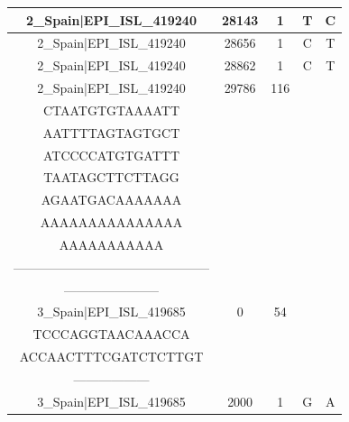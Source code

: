 \documentclass[a4paper,10pt]{article}
\begin{document}
\begin{longtable}{@{}ccccc@{}}
2\_Spain|EPI\_ISL\_419240 & 28143 & 1 & T & C \\* \midrule
2\_Spain|EPI\_ISL\_419240 & 28656 & 1 & C & T \\* \midrule
2\_Spain|EPI\_ISL\_419240 & 28862 & 1 & C & T \\* \midrule
2\_Spain|EPI\_ISL\_419240 & 29786 & 116 & \begin{tabular}[c]{@{}c@{}}CTATATGGAAGAGCC\\ CTAATGTGTAAAATT\\ AATTTTAGTAGTGCT\\ ATCCCCATGTGATTT\\ TAATAGCTTCTTAGG\\ AGAATGACAAAAAAA\\ AAAAAAAAAAAAAAA\\ AAAAAAAAAAA\end{tabular} & \begin{tabular}[c]{@{}c@{}}----------------------------------------------\\ -----------------------------------------------\\ -----------------------\end{tabular} \\* \midrule
3\_Spain|EPI\_ISL\_419685 & 0 & 54 & \begin{tabular}[c]{@{}c@{}}ATTAAAGGTTTATACCT\\ TCCCAGGTAACAAACCA\\ ACCAACTTTCGATCTCTTGT\end{tabular} & \begin{tabular}[c]{@{}c@{}}------------------------------------\\ ------------------\end{tabular} \\* \midrule
3\_Spain|EPI\_ISL\_419685 & 2000 & 1 & G & A \\* \midrule

\end{longtable}
\end{document}
